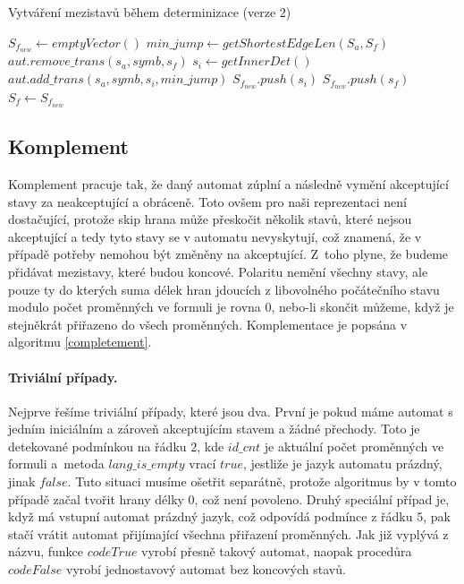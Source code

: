 \begin{algorithm}
    \caption{Vytváření mezistavů během determinizace (verze 2)}
    \label{add_inners_4}
        \begin{algorithmic}[1]
                \State $S_{f_{new}} \gets emptyVector()$   
                \State $min\_jump \gets getShortestEdgeLen(S_a,S_f)$
                                \State $aut.remove\_trans(s_a, symb, s_f)$
                                \State $s_i \gets getInnerDet()$
                                \State $aut.add\_trans(s_a,symb,s_i,min\_jump)$
                                \State $S_{f_{new}}.push(s_i)$
                            \EndIf
                        \EndFor
                    \Else
                        \State $S_{f_{new}}.push(s_f)$
                    \EndIf
                \EndFor
                \State $S_f \gets S_{f_{new}}$
            \EndProcedure
        \end{algorithmic}
\end{algorithm} 

\subsection{Komplement}

Komplement pracuje tak, že daný automat zúplní a následně vymění akceptující stavy za neakceptující a obráceně. Toto ovšem pro naši reprezentaci není dostačující, protože skip hrana může přeskočit několik stavů, které nejsou akceptující a tedy tyto stavy se v automatu nevyskytují, což znamená, že v případě potřeby nemohou být změněny na akceptující. Z~toho plyne, že budeme přidávat mezistavy, které budou koncové. Polaritu nemění všechny stavy, ale pouze ty do kterých suma délek hran jdoucích z libovolného počátečního stavu modulo počet proměnných ve formuli je rovna $0$, nebo-li skončit můžeme, když je stejněkrát přiřazeno do všech proměnných. Komplementace je popsána v algoritmu \ref{completement}.

\paragraph{Triviální případy.} Nejprve řešíme triviální případy, které jsou dva. První je pokud máme automat s jedním iniciálním a zároveň akceptujícím stavem a žádné přechody. Toto je detekované podmínkou na řádku $2$, kde $id\_cnt$ je aktuální počet proměnných ve formuli a~metoda $lang\_is\_empty$ vrací $true$, jestliže je jazyk automatu prázdný, jinak $false$. Tuto situaci musíme ošetřit separátně, protože algoritmus by v tomto případě začal tvořit hrany délky $0$, což není povoleno. Druhý speciální případ je, když má vstupní automat prázdný jazyk, což odpovídá podmínce z řádku $5$, pak stačí vrátit automat přijímající všechna přiřazení proměnných. Jak již vyplývá z názvu, funkce $codeTrue$ vyrobí přesně takový automat, naopak procedůra $codeFalse$ vyrobí jednostavový automat bez koncových stavů. 

